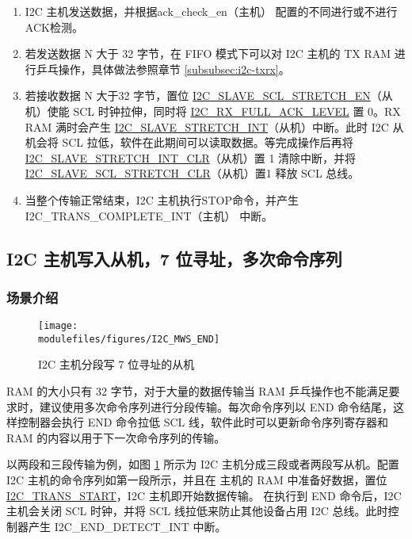 \documentclass[main\_\_CN.tex]{subfiles}
\begin{document}
\begin{enumerate}
\item I2C 主机发送数据，并根据ack\_check\_en（主机）
配置的不同进行或不进行ACK检测。
\item 若发送数据 N 大于 32 字节，在 FIFO 模式下可以对 I2C 主机的 TX RAM 进行乒乓操作，具体做法参照章节 \ref{subsubsec:i2c-txrx}。
\item 若接收数据 N 大于32 字节，置位 \hyperref[fielddesc:I2CSLAVESCLSTRETCHEN]{I2C\_SLAVE\_SCL\_STRETCH\_EN}（从机）使能 SCL 时钟拉伸，同时将 \hyperref[fielddesc:I2CRXFULLACKLEVEL]{I2C\_RX\_FULL\_ACK\_LEVEL} 置 0。RX RAM 满时会产生 \hyperref[int:i2c-slave-stretch]{I2C\_SLAVE\_STRETCH\_INT}（从机）中断。此时 I2C 从机会将 SCL 拉低，软件在此期间可以读取数据。等完成操作后再将 \hyperref[fielddesc:I2CSLAVESTRETCHINTCLR]{I2C\_SLAVE\_STRETCH\_INT\_CLR}（从机）置 1 清除中断，并将\hyperref[fielddesc:I2CSLAVESCLSTRETCHCLR]{I2C\_SLAVE\_SCL\_STRETCH\_CLR}（从机）置1 释放 SCL 总线。

\item 当整个传输正常结束，I2C 主机执行STOP命令，并产生 I2C\_TRANS\_COMPLETE\_INT（主机） 中断。

\end{enumerate}

\subsection{I2C 主机写入从机，7 位寻址，多次命令序列}
\subsubsection{场景介绍}
\begin{figure}[H]
    \centering
    \texttt{[image: \\modulefiles/figures/I2C\_MWS\_END]}    \caption{I2C 主机分段写 7 位寻址的从机}
    \label{fig:i2c-mws7-multiple}
\end{figure}

RAM 的大小只有 32 字节，对于大量的数据传输当 RAM 乒乓操作也不能满足要求时，建议使用多次命令序列进行分段传输。每次命令序列以 END 命令结尾，这样控制器会执行 END 命令拉低  SCL 线，软件此时可以更新命令序列寄存器和 RAM 的内容以用于下一次命令序列的传输。

以两段和三段传输为例，如图 \ref{fig:i2c-mws7-multiple} 所示为 I2C 主机分成三段或者两段写从机。配置 I2C 主机的命令序列如第一段所示，并且在 主机的 RAM 中准备好数据，置位 \hyperref[fielddesc:I2CTRANSSTART]{I2C\_TRANS\_START}，I2C 主机即开始数据传输。 在执行到 END 命令后，I2C 主机会关闭 SCL 时钟，并将 SCL 线拉低来防止其他设备占用 I2C 总线。此时控制器产生 I2C\_END\_DETECT\_INT 中断。
\end{document}
